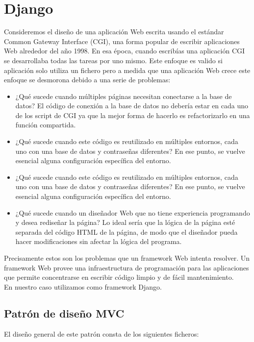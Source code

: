\section{Django}
Consideremos el diseño de una aplicación Web escrita usando el estándar Common Gateway Interface (CGI), una forma popular de escribir aplicaciones Web alrededor del año 1998. En esa época, cuando escribías una aplicación CGI se desarrollaba todas las tareas por uno mismo.
Este enfoque es valido si aplicación solo utiliza un fichero pero a medida que una aplicación Web crece este enfoque se desmorona debido a una serie de problemas:
\begin{itemize}
\item ¿Qué sucede cuando múltiples páginas necesitan conectarse a la base de datos? El código de conexión a la base de datos no debería estar en cada uno de los script de CGI ya que la mejor forma de hacerlo es refactorizarlo en una función compartida.
\item ¿Qué sucede cuando este código es reutilizado en múltiples entornos, cada uno con una base de datos y contraseñas diferentes? En ese punto, se vuelve esencial alguna configuración específica del entorno.
\item ¿Qué sucede cuando este código es reutilizado en múltiples entornos, cada uno con una base de datos y contraseñas diferentes? En ese punto, se vuelve esencial alguna configuración específica del entorno.
\item ¿Qué sucede cuando un diseñador Web que no tiene experiencia programando y desea rediseñar la página? Lo ideal sería que la lógica de la página esté separada del código HTML de la página, de modo que el diseñador pueda hacer modificaciones sin afectar la lógica del programa.
\end{itemize}
Precisamente estos son los problemas que un framework Web intenta resolver. Un framework Web provee una infraestructura de programación para las aplicaciones que permite concentrarse en escribir código limpio y de fácil mantenimiento.
\\En nuestro caso utilizamos como framework Django\cite{django}.
\subsection{Patrón de diseño MVC}
El diseño general de este patrón consta de los siguientes ficheros:
